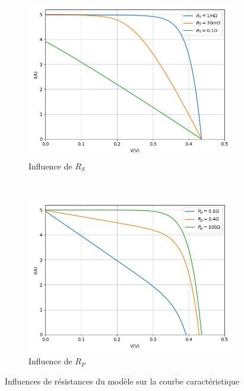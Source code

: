 \begin{figure}[h]
  \begin{subfigure}[b]{.48\textwidth}
    \begin{center}
      \includegraphics[width=\textwidth]{resources/rsinf.png}
      \caption{Influence de $R_S$}
    \end{center}
  \end{subfigure}
  ~
  \begin{subfigure}[b]{.48\textwidth}
    \begin{center}
      \includegraphics[width=\textwidth]{resources/rpinf.png}
      \caption{Influence de $R_P$}
    \end{center}
  \end{subfigure}
  \caption{Influences de résistances du modèle sur la courbe caractéristique}
  \label{fig:rinf}
\end{figure}

